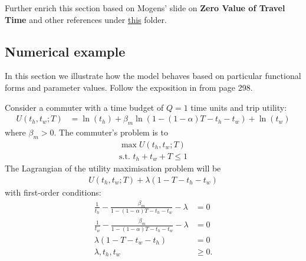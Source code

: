 \documentclass[12pt,a4paper,british]{article}
\begin{document}


 {\color{red}Further enrich this section based on Mogens' slide on \textbf{Zero Value of Travel Time} and other references under \href{C:/Users/deab/Dropbox/Postdoc/automation_scheduling}{this} folder.}


\subsection*{Numerical example}

In this section we illustrate how the model behaves based on particular functional forms and parameter values. Follow the exposition in \citet{FosgerauSmall2017EndogenousSchedulingPreferences} from page 298.

Consider a commuter with a time budget of $Q=1$ time units and trip utility:
\begin{align*}
U\left(t_{h},t_{w};T\right) & =\ln\left(t_{h}\right)+\beta_{m}\ln\left(1-\left(1-\alpha\right)T-t_{h}-t_{w}\right)+\ln\left(t_{w}\right)
\end{align*}
where $\beta_{m}>0$. The commuter's problem is to 
\begin{gather*}
\max U\left(t_{h},t_{w};T\right)\\
\mbox{s.t. }t_{h}+t_{w}+T\leq1
\end{gather*}
The Lagrangian of the utility maximisation problem will be
\begin{gather*}
U\left(t_{h},t_{w};T\right)+\lambda\left(1-T-t_{h}-t_{w}\right)
\end{gather*}
with first-order conditions:
\begin{align*}
\frac{1}{t_{h}}-\frac{\beta_{m}}{1-\left(1-\alpha\right)T-t_{h}-t_{w}}-\lambda & =0\\
\frac{1}{t_{w}}-\frac{\beta_{m}}{1-\left(1-\alpha\right)T-t_{h}-t_{w}}-\lambda & =0\\
\lambda\left(1-T-t_{w}-t_{h}\right) & =0\\
\lambda,t_{h},t_{w} & \geq0.
\end{align*}
\end{document}
